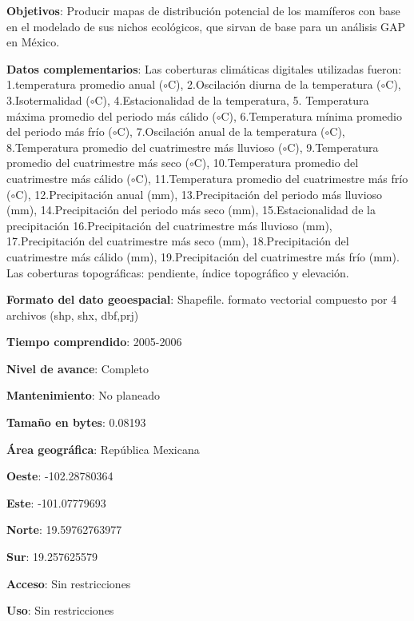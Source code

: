 \documentclass[twoside]{book}
\begin{document}
{{\textbf{Objetivos}: Producir mapas de distribución potencial de los mamíferos con base en el modelado de sus nichos ecológicos, que sirvan de base para un análisis GAP en México.

\textbf{Datos complementarios}: Las coberturas climáticas digitales utilizadas fueron: 1.temperatura promedio anual ($\circ$C), 2.Oscilación diurna de la temperatura ($\circ$C), 3.Isotermalidad ($\circ$C), 4.Estacionalidad de la temperatura, 5. Temperatura máxima promedio del periodo más cálido ($\circ$C), 6.Temperatura mínima promedio del periodo más frío ($\circ$C), 7.Oscilación anual de la temperatura ($\circ$C), 8.Temperatura promedio del cuatrimestre más lluvioso ($\circ$C), 9.Temperatura promedio del cuatrimestre más seco ($\circ$C), 10.Temperatura promedio del cuatrimestre más cálido ($\circ$C), 11.Temperatura promedio del cuatrimestre más frío ($\circ$C), 12.Precipitación anual (mm), 13.Precipitación del periodo más lluvioso (mm), 14.Precipitación del periodo más seco (mm), 15.Estacionalidad de la precipitación 16.Precipitación del cuatrimestre más lluvioso (mm), 17.Precipitación del cuatrimestre más seco (mm), 18.Precipitación del cuatrimestre más cálido (mm), 19.Precipitación del cuatrimestre más frío (mm). Las coberturas topográficas: pendiente, índice topográfico y elevación.

\textbf{Formato del dato geoespacial}: Shapefile. formato vectorial compuesto por 4 archivos (shp, shx, dbf,prj)

\textbf{Tiempo comprendido}: 2005-2006

\textbf{Nivel de avance}: Completo

\textbf{Mantenimiento}: No planeado

\textbf{Tamaño en bytes}: 0.08193


\textbf{Área geográfica}: República Mexicana


\textbf{Oeste}: -102.28780364

\textbf{Este}: -101.07779693

\textbf{Norte}: 19.59762763977

\textbf{Sur}: 19.257625579


\textbf{Acceso}: Sin restricciones

\textbf{Uso}: Sin restricciones


}}
\end{document}
